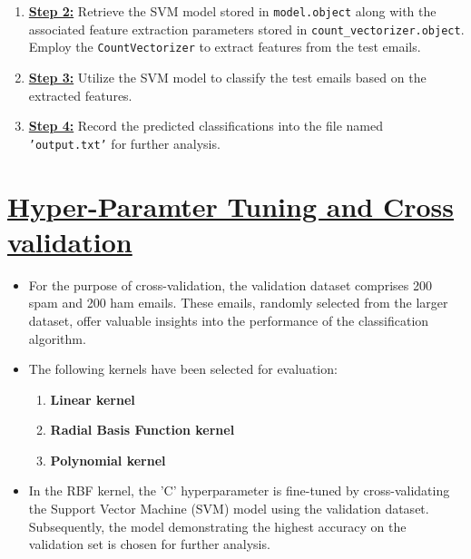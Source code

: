 \documentclass[12pt, a4paper]{article}
\newcommand{\ulsection}[1]{\texorpdfstring{\uline{#1}}{#1}}
\begin{document}
\begin{itemize}
\begin{enumerate}
        \item \textbf{\underline{Step 2:}} Retrieve the SVM model stored in \texttt{model.object} along with the associated feature extraction parameters stored in \texttt{count\_vectorizer.object}. Employ the \texttt{CountVectorizer} to extract features from the test emails.
        
        \item \textbf{\underline{Step 3:}} Utilize the SVM model to classify the test emails based on the extracted features.
        
        \item \textbf{\underline{Step 4:}} Record the predicted classifications into the file named \texttt{'output.txt'} for further analysis.
    \end{enumerate}
\end{itemize}
\hfuzz=19pt \section{\ulsection{Hyper-Paramter Tuning and Cross validation}}
\begin{itemize}
    \item \large For the purpose of cross-validation, the validation dataset comprises 200 spam and 200 ham emails. These emails, randomly selected from the larger dataset, offer valuable insights into the performance of the classification algorithm.
    \item \large The following kernels have been selected for evaluation:
    \begin{enumerate}
        \item \textbf{Linear kernel}
        \item \textbf{Radial Basis Function kernel}
        \item \textbf{Polynomial kernel}
    \end{enumerate}
    \item \large In the RBF kernel, the 'C' hyperparameter is fine-tuned by cross-validating the Support Vector Machine (SVM) model using the validation dataset. Subsequently, the model demonstrating the highest accuracy on the validation set is chosen for further analysis.
\end{itemize}
\end{document}
